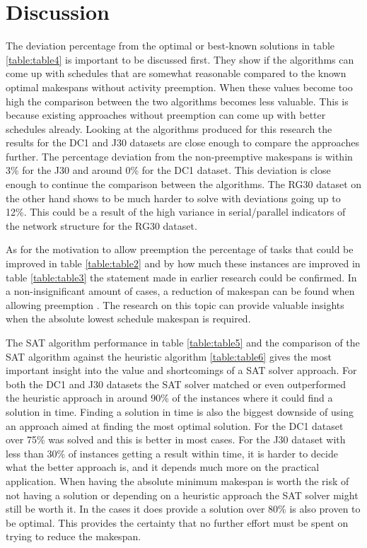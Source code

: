\section{Discussion}
The deviation percentage from the optimal or best-known solutions in table \ref{table:table4} is important to be discussed first. They show if the algorithms can come up with schedules that are somewhat reasonable compared to the known optimal makespans without activity preemption. When these values become too high the comparison between the two algorithms becomes less valuable. This is because existing approaches without preemption can come up with better schedules already.
Looking at the algorithms produced for this research the results for the DC1 and J30 datasets are close enough to compare the approaches further. The percentage deviation from the non-preemptive makespans is within 3\% for the J30 and around 0\% for the DC1 dataset. This deviation is close enough to continue the comparison between the algorithms. The RG30 dataset on the other hand shows to be much harder to solve with deviations going up to 12\%. This could be a result of the high variance in serial/parallel indicators of the network structure for the RG30 dataset.

As for the motivation to allow preemption the percentage of tasks that could be improved in table \ref{table:table2} and by how much these instances are improved in table \ref{table:table3} the statement made in earlier research could be confirmed. In a non-insignificant amount of cases, a reduction of makespan can be found when allowing preemption \cite{RN1}. The research on this topic can provide valuable insights when the absolute lowest schedule makespan is required.

The SAT algorithm performance in table \ref{table:table5} and the comparison of the SAT algorithm against the heuristic algorithm \ref{table:table6} gives the most important insight into the value and shortcomings of a SAT solver approach. For both the DC1 and J30 datasets the SAT solver matched or even outperformed the heuristic approach in around 90\% of the instances where it could find a solution in time. Finding a solution in time is also the biggest downside of using an approach aimed at finding the most optimal solution. For the DC1 dataset over 75\% was solved and this is better in most cases. For the J30 dataset with less than 30\% of instances getting a result within time, it is harder to decide what the better approach is, and it depends much more on the practical application. When having the absolute minimum makespan is worth the risk of not having a solution or depending on a heuristic approach the SAT solver might still be worth it. In the cases it does provide a solution over 80\% is also proven to be optimal. This provides the certainty that no further effort must be spent on trying to reduce the makespan.

